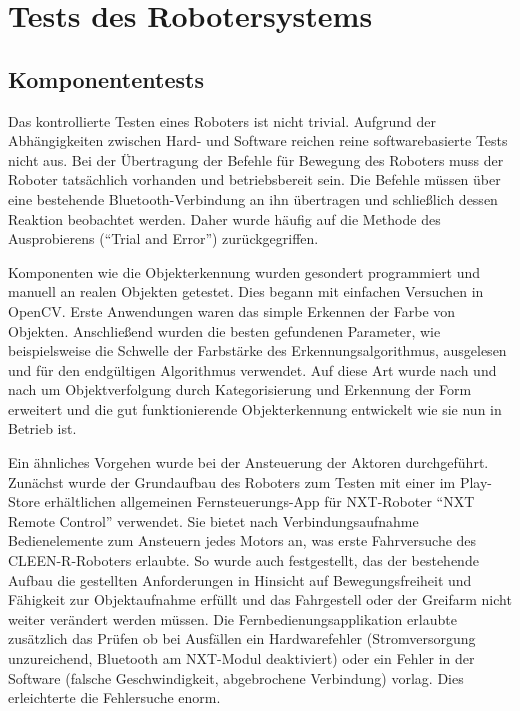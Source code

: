 \chapter{Tests des Robotersystems}
\label{cha:Tests}

\section{Komponententests}

Das kontrollierte Testen eines Roboters ist nicht trivial. Aufgrund der Abhängigkeiten zwischen Hard- und Software reichen reine softwarebasierte Tests nicht aus. Bei der Übertragung der Befehle für Bewegung des Roboters  muss der Roboter tatsächlich vorhanden und betriebsbereit sein. Die Befehle müssen über eine bestehende Bluetooth-Verbindung an ihn übertragen und schließlich dessen Reaktion beobachtet werden. Daher wurde häufig auf die Methode des Ausprobierens (\enquote{Trial and Error}) zurückgegriffen. 

Komponenten wie die Objekterkennung wurden gesondert programmiert und manuell an realen Objekten getestet. Dies begann mit einfachen Versuchen in OpenCV. Erste Anwendungen waren das simple Erkennen der Farbe von Objekten. Anschließend wurden die besten gefundenen Parameter, wie beispielsweise  die Schwelle der Farbstärke des Erkennungsalgorithmus, ausgelesen und für den endgültigen Algorithmus verwendet. Auf diese Art wurde nach und nach um Objektverfolgung durch Kategorisierung und Erkennung der Form erweitert und die gut funktionierende Objekterkennung entwickelt wie sie nun in Betrieb ist.

Ein ähnliches Vorgehen wurde bei der Ansteuerung der Aktoren durchgeführt. Zunächst wurde der Grundaufbau des Roboters zum Testen mit einer im Play-Store erhältlichen allgemeinen Fernsteuerungs-App für NXT-Roboter \enquote{NXT Remote Control} \cite{nxt_remote_control} verwendet. Sie bietet nach Verbindungsaufnahme Bedienelemente zum Ansteuern jedes Motors an, was erste Fahrversuche des CLEEN-R-Roboters erlaubte. So wurde auch festgestellt, das der bestehende Aufbau die gestellten Anforderungen in Hinsicht auf Bewegungsfreiheit und Fähigkeit zur Objektaufnahme erfüllt und das Fahrgestell oder der Greifarm nicht weiter verändert werden müssen. Die Fernbedienungsapplikation erlaubte zusätzlich das Prüfen ob bei Ausfällen ein Hardwarefehler (Stromversorgung unzureichend, Bluetooth am NXT-Modul deaktiviert) oder ein Fehler in der Software (falsche Geschwindigkeit, abgebrochene Verbindung) vorlag. Dies erleichterte die Fehlersuche enorm.

